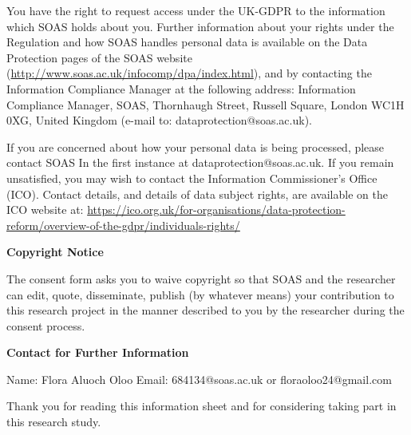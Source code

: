 You have the right to request access under the UK-GDPR to the information which SOAS holds about you. Further information about your rights under the Regulation and how SOAS handles personal data is available on the Data Protection pages of the SOAS website (\url{http://www.soas.ac.uk/infocomp/dpa/index.html}), and by contacting the Information Compliance Manager at the following address: Information Compliance Manager, SOAS, Thornhaugh Street, Russell Square, London WC1H 0XG, United Kingdom (e-mail to: dataprotection@soas.ac.uk).

If you are concerned about how your personal data is being processed, please contact SOAS In the first instance at dataprotection@soas.ac.uk. If you remain unsatisfied, you may wish to contact the Information Commissioner's Office (ICO). Contact details, and details of data subject rights, are available on the ICO website at: \url{https://ico.org.uk/for-organisations/data-protection-reform/overview-of-the-gdpr/individuals-rights/}

\textbf{Copyright Notice}

The consent form asks you to waive copyright so that SOAS and the researcher can edit, quote, disseminate, publish (by whatever means) your contribution to this research project in the manner described to you by the researcher during the consent process. 

\textbf{Contact for Further Information}

Name: Flora Aluoch Oloo Email: 684134@soas.ac.uk or floraoloo24@gmail.com

Thank you for reading this information sheet and for considering taking part in this research study.